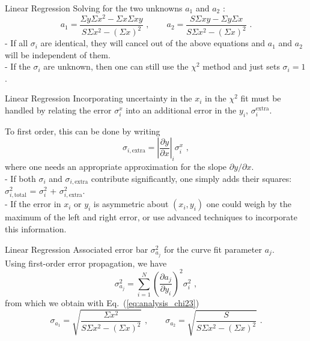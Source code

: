 \documentclass[11pt]{beamer}
\begin{document}
\begin{frame}[fragile]{Linear Regression}
Solving for the two unknowns
$a_1$ and $a_2$ :
\begin{equation}
a_1 = \frac{\Sigma y\Sigma x^2 - \Sigma x \Sigma xy}{S\Sigma x^2 - (\Sigma x)^2}
\,\,,\hspace{2em} a_2 = \frac{S\Sigma xy - \Sigma y \Sigma x}{S\Sigma x^2 - (\Sigma x)^2}\,\,.
\label{eq:analysis_chi23}
\end{equation}
- If all $\sigma_i$ are identical, they will cancel out of the
above equations and $a_1$ and $a_2$ will be independent of them.\\

- If the $\sigma_i$ are unknown, then one can still use the $\chi^2$ method and
just sets $\sigma_i = 1$.
\end{frame}

\begin{frame}[fragile]{Linear Regression}
Incorporating uncertainty in the $x_i$ in the $\chi^2$ fit must be handled
by relating the error $\sigma^x_i$ into an additional error in the $y_i$,
$\sigma^{\text{extra}}_i$. \\
\bigskip

To first order, this can be done by writing
\begin{equation}
\sigma_{i,\text{extra}} = \left|\frac{\partial y}{\partial x} \right|_i \sigma^x_i\,\,,
\end{equation}
where one needs an appropriate approximation for the slope $\partial y
/ \partial x$. \\
- If both $\sigma_i$ and $\sigma_{i,\text{extra}}$
contribute significantly, one simply adds their squares:
$\sigma_{i,\text{total}}^2$ = $\sigma_i^2$ + $\sigma_{i,\text{extra}}^2$.\\

- If the error in $x_i$ or $y_i$ is asymmetric about $(x_i,y_i)$ one
could weigh by the maximum of the left and right error, or use
advanced techniques to incorporate this information.
\end{frame}

\begin{frame}[fragile]{Linear Regression}
Associated error bar  $\sigma_{a_j}^2$  for the
curve fit parameter $a_j$.\\
Using first-order error propagation,
we have 
\begin{equation}
\sigma^2_{a_j} = \sum_{i=1}^N \left(\frac{\partial a_j}{\partial y_i}
\right)^2 \sigma_i^2\,\,,
\end{equation}
from which we obtain with Eq.~(\ref{eq:analysis_chi23})
\begin{equation}
\sigma_{a_1} = \sqrt{\frac{\Sigma x^2}{S\Sigma x^2 - (\Sigma x)^2}}\,\,,
\hspace{2em} \sigma_{a_2} = \sqrt{\frac{S}{S\Sigma x^2 - (\Sigma x)^2}}\,\,.
\end{equation}
\end{frame}
\end{document}
